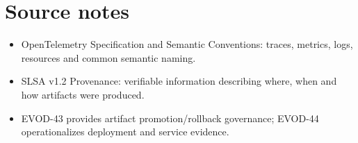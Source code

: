 \chapter*{Source notes}
\begin{itemize}
\item OpenTelemetry Specification and Semantic Conventions: traces, metrics, logs, resources and common semantic naming.
\item SLSA v1.2 Provenance: verifiable information describing where, when and how artifacts were produced.
\item EVOD-43 provides artifact promotion/rollback governance; EVOD-44 operationalizes deployment and service evidence.
\end{itemize}